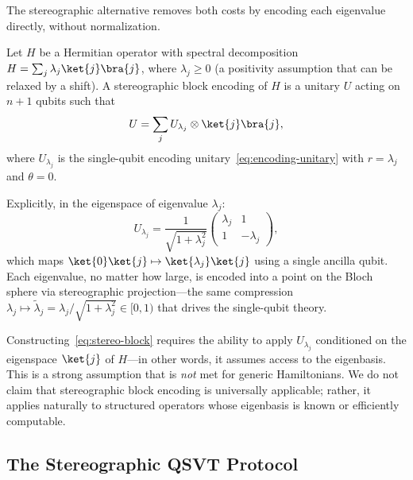 The stereographic alternative removes both costs by encoding
each eigenvalue directly, without normalization.

\begin{definition}
	\label{def:stereo-block}
	Let $H$ be a Hermitian operator with spectral decomposition $H = \sum_j \lambda_j \ket{j}\bra{j}$, where $\lambda_j \geq 0$ (a positivity assumption that can be relaxed by a shift). A stereographic block encoding of $H$ is a unitary $U$ acting on $n + 1$ qubits such that
	\begin{equation}
		U = \sum_j U_{\lambda_j} \otimes \ket{j}\bra{j},
		\label{eq:stereo-block}
	\end{equation}
	where $U_{\lambda_j}$ is the single-qubit encoding unitary~\eqref{eq:encoding-unitary} with $r = \lambda_j$ and $\theta = 0$.
\end{definition}

Explicitly, in the eigenspace of eigenvalue $\lambda_j$:
\begin{equation}
	U_{\lambda_j} = \frac{1}{\sqrt{1+\lambda_j^2}}\begin{pmatrix} \lambda_j & 1 \\ 1 & -\lambda_j \end{pmatrix},
\end{equation}
which maps $\ket{0}\ket{j} \mapsto \ket{\lambda_j}\ket{j}$ using
a single ancilla qubit.  Each eigenvalue, no matter how large,
is encoded into a point on the Bloch sphere via stereographic
projection---the same compression
$\lambda_j \mapsto \tilde{\lambda}_j =
	\lambda_j/\sqrt{1+\lambda_j^2} \in [0,1)$ that drives the
single-qubit theory.

\begin{remark}
	\label{rem:caveats}
	Constructing~\eqref{eq:stereo-block} requires the ability to apply $U_{\lambda_j}$ conditioned on the eigenspace $\ket{j}$ of $H$---in other words, it assumes access to the eigenbasis. This is a strong assumption that is \emph{not} met for generic Hamiltonians. We do not claim that stereographic block encoding is universally applicable; rather, it applies naturally to structured operators whose eigenbasis is known or efficiently computable.
\end{remark}

\subsection{The Stereographic QSVT Protocol}
\label{subsec:stereo-qsvt}

